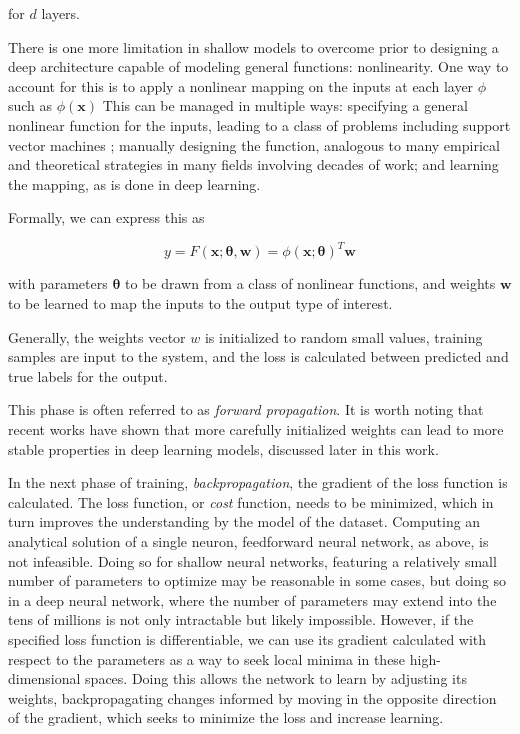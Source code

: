 for $d$ layers.

There is one more limitation in shallow models to overcome prior to designing a deep architecture capable of modeling general functions: nonlinearity.
One way to account for this is to apply a nonlinear mapping on the inputs at each layer $\phi$ such as $\phi(\textbf{x})$
This can be managed in multiple ways: specifying a general nonlinear function for the inputs, leading to a class of problems including support vector machines \cite{cortes1995support}; manually designing the function, analogous to many empirical and theoretical strategies in many fields involving decades of work; and learning the mapping, as is done in deep learning.

Formally, we can express this as

\begin{equation}
y=F(\textbf{x}; \bm{\theta},\textbf{w}) = \phi(\textbf{x};\bm{\theta})^T\textbf{w}
\end{equation}

with parameters $\bm{\theta}$ to be drawn from a class of nonlinear functions, and weights $\textbf{w}$ to be learned to map the inputs to the output type of interest.

Generally, the weights vector $w$ is initialized to random small values, training samples are input to the system, and the loss is calculated between predicted and true labels for the output.

This phase is often referred to as \textit{forward propagation}.
It is worth noting that recent works have shown \cite{glorot2010understanding} \cite{he2015delving} that more carefully initialized weights can lead to more stable properties in deep learning models, discussed later in this work.

In the next phase of training, \textit{backpropagation}, the gradient of the loss function is calculated.
The loss function, or \textit{cost} function, needs to be minimized, which in turn improves the understanding by the model of the dataset.
Computing an analytical solution of a single neuron, feedforward neural network, as above, is not infeasible.
Doing so for shallow neural networks, featuring a relatively small number of parameters to optimize may be reasonable in some cases, but doing so in a deep neural network, where the number of parameters may extend into the tens of millions is not only intractable but likely impossible.
However, if the specified loss function is differentiable, we can use its gradient calculated with respect to the parameters as a way to seek local minima in these high-dimensional spaces.
Doing this allows the network to learn by adjusting its weights, backpropagating changes informed by moving in the opposite direction of the gradient, which seeks to minimize the loss and increase learning.

